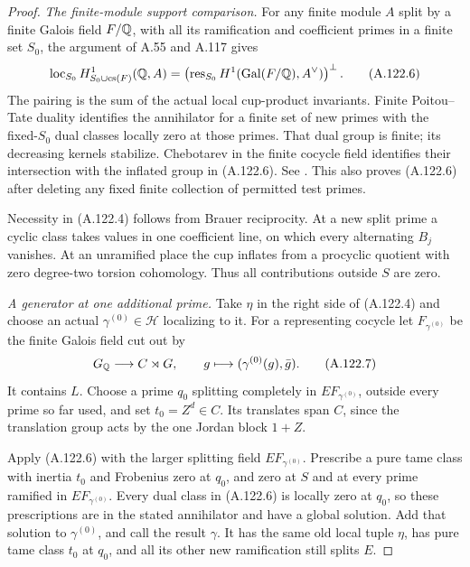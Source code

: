 \begin{proof}
\emph{The finite-module support comparison.}
For any finite module \(A\) split by a finite Galois
field \(F/\mathbb Q\), with all its ramification and coefficient
primes in a finite set \(S_0\), the argument of
A.55 and A.117 gives
\[
 \operatorname{loc}_{S_0}
 H^1_{S_0\cup{\rm cs}(F)}(\mathbb Q,A)
   =\left(\operatorname{res}_{S_0}
        H^1(\operatorname{Gal}(F/\mathbb Q),A^\vee)\right)^\perp .
 \tag{A.122.6}
\]
The pairing is the sum of the actual local cup-product
invariants.  Finite Poitou--Tate duality identifies the
annihilator for a finite set of new primes with the
fixed-\(S_0\) dual classes locally zero at those primes.
That dual group is finite; its decreasing kernels
stabilize.  Chebotarev in the finite cocycle field
identifies their intersection with the inflated group
in (A.122.6).
See \cite[I, Theorem 4.10(b) and Corollary 4.15]{BIR_MilneADT}.
This also proves (A.122.6) after deleting any fixed
finite collection of permitted test primes.

Necessity in (A.122.4) follows from Brauer reciprocity.
At a new split prime a cyclic class takes values in
one coefficient line, on which every alternating
\(B_j\) vanishes.  At an unramified place the cup
inflates from a procyclic quotient with zero
degree-two torsion cohomology.  Thus all contributions
outside \(S\) are zero.

\emph{A generator at one additional prime.}
Take \(\eta\) in the right side of (A.122.4) and
choose an actual \(\gamma^{(0)}\in\mathcal H\)
localizing to it.
For a representing cocycle let \(F_{\gamma^{(0)}}\)
be the finite Galois field cut out by
\[
 G_\mathbb Q\longrightarrow C\rtimes G,\qquad
                  g\longmapsto(\gamma^{(0)}(g),\bar g).
 \tag{A.122.7}
\]
It contains \(L\).
Choose a prime \(q_0\) splitting completely in
\(E F_{\gamma^{(0)}}\), outside every prime so far
used, and set \(t_0=Z^d\in C\).
Its translates span \(C\), since the translation
group acts by the one Jordan block \(1+Z\).

Apply (A.122.6) with the larger splitting field
\(E F_{\gamma^{(0)}}\).
Prescribe a pure tame class with inertia \(t_0\)
and Frobenius zero at \(q_0\), and zero at \(S\)
and at every prime ramified in \(E F_{\gamma^{(0)}}\).
Every dual class in (A.122.6) is locally zero at
\(q_0\), so these prescriptions are in the stated
annihilator and have a global solution.
Add that solution to \(\gamma^{(0)}\), and call
the result \(\gamma\).
It has the same old local tuple \(\eta\), has
pure tame class \(t_0\) at \(q_0\), and all its
other new ramification still splits \(E\).


\end{proof}
